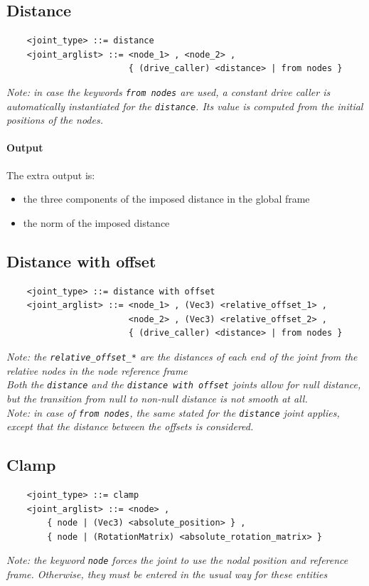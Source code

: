 \subsection{Distance}
\begin{verbatim}
    <joint_type> ::= distance 
    <joint_arglist> ::= <node_1> , <node_2> ,
                        { (drive_caller) <distance> | from nodes }
\end{verbatim}

\noindent
{\em
    Note: in case the keywords \texttt{from nodes} are used, a constant drive
    caller is automatically instantiated for the \texttt{distance}. 
    Its value is computed from the initial positions of the nodes.
}

\paragraph{Output}
The extra output is:
\begin{itemize}
    \item the three components of the imposed distance in the global frame
    \item the norm of the imposed distance
\end{itemize}


\subsection{Distance with offset}
\begin{verbatim}
    <joint_type> ::= distance with offset
    <joint_arglist> ::= <node_1> , (Vec3) <relative_offset_1> ,
                        <node_2> , (Vec3) <relative_offset_2> , 
                        { (drive_caller) <distance> | from nodes }
\end{verbatim}
{\em 
    Note: the \texttt{relative\_offset\_*} are the distances of each end
    of the joint from the relative nodes in the node reference frame \\
    Both the \texttt{distance} and the \texttt{distance with offset} joints
    allow for null distance, but the transition from null to non-null
    distance is not smooth at all.
} \\
{\em
    Note: in case of \texttt{from nodes}, the same stated for the \texttt{distance}
    joint applies, except that the distance between the offsets is
    considered. 
}

\subsection{Clamp}
\begin{verbatim}
    <joint_type> ::= clamp 
    <joint_arglist> ::= <node> , 
        { node | (Vec3) <absolute_position> } ,
        { node | (RotationMatrix) <absolute_rotation_matrix> }
\end{verbatim}
{\em
    Note: the keyword \texttt{node} forces the joint to use the nodal position
    and reference frame. Otherwise, they must be entered in the usual way
    for these entities
}

